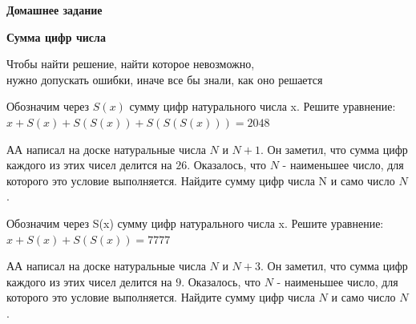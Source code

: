 \centerline{\Huge \bf  Домашнее задание }
\centerline{\Huge \bf Сумма цифр числа}

\begin{flushright}
    \scriptsize{Чтобы найти решение, найти которое невозможно, \\
                нужно допускать ошибки, иначе все бы знали, как оно решается\\
                }
\end{flushright}

 Обозначим через $S(x)$ сумму цифр натурального числа x. Решите уравнение:
$x + S(x) + S(S(x)) + S(S(S(x))) = 2048$

 АА написал на доске натуральные числа $N$ и $N+1$. Он заметил, что сумма цифр каждого из этих чисел делится на $26$. Оказалось, что $N$ - наименьшее число, для которого это условие выполняется. Найдите сумму цифр числа N и само число $N$.

 Обозначим через S(x) сумму цифр натурального числа x. Решите уравнение:
$x + S(x) + S(S(x))  = 7777$

 АА написал на доске натуральные числа $N$  и  $N+3$. Он заметил, что сумма цифр каждого из этих чисел делится на $9$. Оказалось, что $N$ - наименьшее число, для которого это условие выполняется. Найдите сумму цифр числа $N$ и само число $N$.
